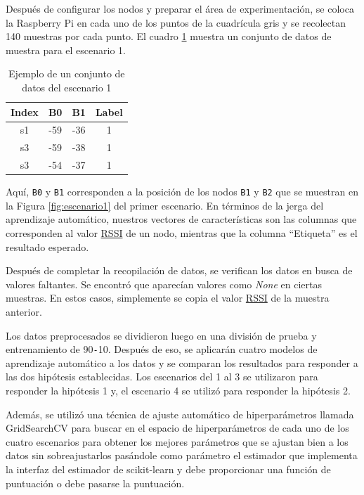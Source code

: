 Después de configurar los nodos y preparar el área de experimentación, se coloca la Raspberry Pi en cada uno de los puntos de la cuadrícula gris y se recolectan 140 muestras por cada punto. El cuadro \ref{cuadro:tabla1} muestra un conjunto de datos de muestra para el escenario 1.


\begin{table}[H]
\begin{center}
\begin{tabular}{|c|c|c|c|}
\hline
\textbf{Index} & \textbf{B0} & \textbf{B1} & \textbf{Label}  \\
\hline
s1 & -59 & -36 & 1 \\  
s3 & -59 & -38 & 1 \\   
s3 & -54 & -37 & 1 \\   
\hline
\end{tabular}
\caption{Ejemplo de un conjunto de datos del escenario 1}
\label{cuadro:tabla1}
\end{center}
\end{table}


Aquí, \texttt{B0} y \texttt{B1} corresponden a la posición de los nodos \texttt{B1} y \texttt{B2} que se muestran en la Figura \ref{fig:escenario1} del primer escenario. En términos de la jerga del aprendizaje automático, nuestros vectores de características son las columnas que corresponden al valor \hyperlink{RSSI}{RSSI} de un nodo, mientras que la columna “Etiqueta” es el resultado esperado.

Después de completar la recopilación de datos, se verifican los datos en busca de valores faltantes. Se encontró que aparecían valores como \textit{None} en ciertas muestras. En estos casos, simplemente se copia el valor \hyperlink{RSSI}{RSSI} de la muestra anterior.

Los datos preprocesados se dividieron luego en una división de prueba y entrenamiento de 90\texttt{-}10. Después de eso, se aplicarán cuatro modelos de aprendizaje automático a los datos y se comparan los resultados para responder a las dos hipótesis establecidas. Los escenarios del 1 al 3 se utilizaron para responder la hipótesis 1 y, el escenario 4 se utilizó para responder la hipótesis 2.

Además, se utilizó una técnica de ajuste automático de hiperparámetros llamada GridSearchCV para buscar en el espacio de hiperparámetros de cada uno de los cuatro escenarios para obtener los mejores parámetros que se ajustan bien a los datos sin sobreajustarlos pasándole como parámetro el estimador que implementa la interfaz del estimador de scikit-learn y debe proporcionar una función de puntuación o debe pasarse la puntuación.


